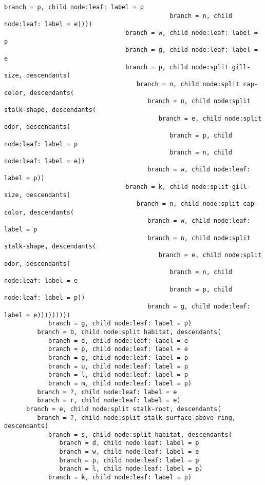 \documentclass[11pt]{article}
\begin{document}
\begin{Verbatim}[commandchars=\\\{\}]
                                             branch = p, child node:leaf: label = p
                                             branch = n, child node:leaf: label = e))))
                                 branch = w, child node:leaf: label = p
                                 branch = g, child node:leaf: label = e
                                 branch = p, child node:split gill-size, descendants(
                                    branch = n, child node:split cap-color, descendants(
                                       branch = n, child node:split stalk-shape, descendants(
                                          branch = e, child node:split odor, descendants(
                                             branch = p, child node:leaf: label = p
                                             branch = n, child node:leaf: label = e))
                                       branch = w, child node:leaf: label = p))
                                 branch = k, child node:split gill-size, descendants(
                                    branch = n, child node:split cap-color, descendants(
                                       branch = w, child node:leaf: label = p
                                       branch = n, child node:split stalk-shape, descendants(
                                          branch = e, child node:split odor, descendants(
                                             branch = n, child node:leaf: label = e
                                             branch = p, child node:leaf: label = p))
                                       branch = g, child node:leaf: label = e)))))))))
            branch = g, child node:leaf: label = p)
         branch = b, child node:split habitat, descendants(
            branch = d, child node:leaf: label = e
            branch = p, child node:leaf: label = e
            branch = g, child node:leaf: label = p
            branch = u, child node:leaf: label = p
            branch = l, child node:leaf: label = p
            branch = m, child node:leaf: label = p)
         branch = ?, child node:leaf: label = e
         branch = r, child node:leaf: label = e)
      branch = e, child node:split stalk-root, descendants(
         branch = ?, child node:split stalk-surface-above-ring, descendants(
            branch = s, child node:split habitat, descendants(
               branch = d, child node:leaf: label = p
               branch = w, child node:leaf: label = e
               branch = p, child node:leaf: label = p
               branch = l, child node:leaf: label = p)
            branch = k, child node:leaf: label = p)

\end{Verbatim}
\end{document}
